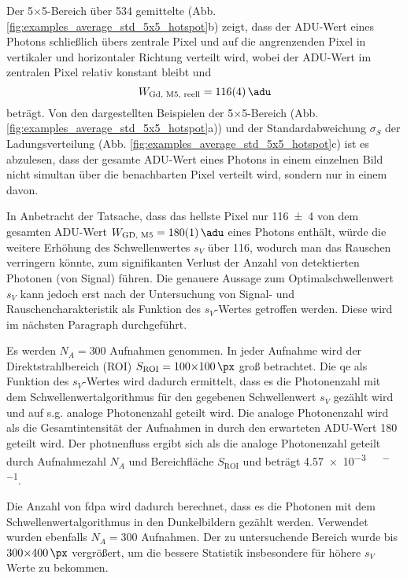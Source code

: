 \noindent
Der 5$\times$\SI{5}{\px}-Bereich über 534 gemittelte  (Abb. \ref{fig:examples_average_std_5x5_hotspot}b) zeigt, dass der ADU-Wert eines Photons schließlich übers zentrale Pixel und auf die angrenzenden Pixel in vertikaler und horizontaler Richtung verteilt wird, wobei der ADU-Wert im zentralen Pixel relativ konstant bleibt und 
\begin{equation}
    W_\text{Gd, M5, reell}  = \SI{116(4)}{\adu} 
\end{equation}
beträgt. Von den dargestellten Beispielen der 5$\times$\SI{5}{\px}-Bereich (Abb. \ref{fig:examples_average_std_5x5_hotspot}a)) und der Standardabweichung $\sigma_{S}$ der Ladungsverteilung (Abb. \ref{fig:examples_average_std_5x5_hotspot}c) ist es abzulesen, dass der gesamte ADU-Wert eines Photons in einem einzelnen Bild nicht simultan über die benachbarten Pixel verteilt wird, sondern nur in einem davon. 

\noindent
In Anbetracht der Tatsache, dass das hellste Pixel nur \SI{116(4)}{\adu} von dem gesamten ADU-Wert $W_\text{GD, M5} = \SI{180(1)}{\adu}$ eines Photons enthält, würde die weitere Erhöhung des Schwellenwertes $s_V$ über \SI{116}{\adu}, wodurch man das Rauschen verringern könnte, zum signifikanten Verlust der Anzahl von detektierten Photonen (von Signal) führen. Die genauere Aussage zum Optimalschwellenwert $s_V$ kann jedoch erst nach der Untersuchung von Signal- und Rauschencharakteristik als Funktion des $s_V$-Wertes getroffen werden. Diese wird im nächsten Paragraph durchgeführt. 

\noindent
Es werden $N_A = 300$ Aufnahmen genommen. In jeder Aufnahme wird der Direktstrahlbereich (ROI) $S_\text{ROI} = 100{\times}\SI{100}{\px}$ groß betrachtet. Die \gls{qe} als Funktion des $s_V$-Wertes wird dadurch ermittelt, dass es die Photonenzahl mit dem Schwellenwertalgorithmus für den gegebenen Schwellenwert $s_V$ gezählt wird und auf s.g. analoge Photonenzahl geteilt wird. Die analoge Photonenzahl wird als die Gesamtintensität der Aufnahmen in \si{\adu} durch den erwarteten ADU-Wert \SI{180}{\adu} geteilt wird. Der \gls{photnenfluss} ergibt sich als die analoge Photonenzahl geteilt durch Aufnahmezahl $N_A$ und Bereichfläche $S_\text{ROI}$ und beträgt \SI{4.57e-3}{\photons\per\pixel\per\capture}.

\noindent
Die Anzahl von \gls{fdpa} wird dadurch berechnet, dass es die Photonen mit dem Schwellenwertalgorithmus in den Dunkelbildern gezählt werden. Verwendet wurden ebenfalls $N_A = 300$ Aufnahmen. Der zu untersuchende Bereich wurde bis $300{\times}\SI{400}{\px}$ vergrößert, um die bessere Statistik insbesondere für höhere $s_V$ Werte zu bekommen.

